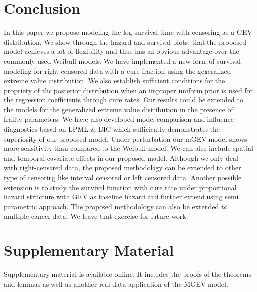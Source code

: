 \documentclass[smallextended]{svjour3}       %
\begin{document}
{\section{Conclusion}
In this paper we propose modeling the log survival time with censoring as a GEV distribution. We show through
the hazard and survival plots, that the proposed model achieves a lot of flexibility and thus has an obvious advantage over the commonly used Weibull models. We have implemented a new form of survival modeling for right-censored data with a cure fraction using the generalized extreme value distribution. We also establish sufficient conditions for the propriety of the posterior distribution when an improper uniform prior is used for the regression coefficients through cure rates. Our results could be extended to the models for the generalized extreme value distribution in the presence of frailty parameters. We have also developed model comparison and influence diagnostics based on LPML \& DIC which sufficiently demonstrates the superiority of our proposed model. Under perturbation our mGEV model shows more sensitivity than compared to the Weibull model. We can also include spatial and temporal covariate effects in our proposed model. Although we only deal with right-censored data, the proposed methodology can be extended to other type of censoring like interval censored or left censored data. Another possible extension is to study the survival function with cure rate under proportional hazard structure with GEV as baseline hazard and further extend using semi parametric approach. The proposed methodology can also be extended to multiple cancer data. We leave that exercise for future work.

\section{Supplementary Material}

Supplementary material is available online. It includes the proofs of the theorems and lemmas as well as another real data application of the MGEV model.



}
\end{document}
